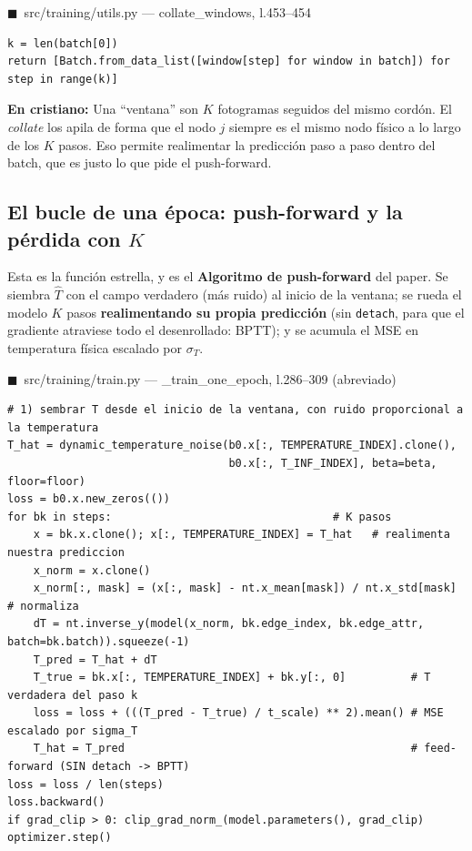 \documentclass[11pt]{article}
\theoremstyle{definition}
\theoremstyle{plain}
\newcommand{\dummies}[1]{%
  \par\smallskip\noindent
  \colorbox{yellow!18}{\parbox{\dimexpr\linewidth-2\fboxsep}{%
  \small\textbf{En cristiano:} #1}}\par\smallskip}
\newcommand{\srcref}[1]{\par\smallskip\noindent
  {\footnotesize\ttfamily\textcolor{srcblue}{$\blacksquare$\ #1}}\par\vspace{1pt}}
\begin{document}
\srcref{src/training/utils.py — collate\_windows, l.453--454}
\begin{lstlisting}
k = len(batch[0])
return [Batch.from_data_list([window[step] for window in batch]) for step in range(k)]
\end{lstlisting}

\dummies{Una ``ventana'' son $K$ fotogramas seguidos del mismo cordón. El
\emph{collate} los apila de forma que el nodo $j$ siempre es el mismo nodo físico a
lo largo de los $K$ pasos. Eso permite realimentar la predicción paso a paso dentro
del batch, que es justo lo que pide el push-forward.}

\subsection{El bucle de una época: push-forward y la pérdida con $K$}

Esta es la función estrella, y es el \textbf{Algoritmo de push-forward} del paper.
Se siembra $\hat T$ con el campo verdadero (más ruido) al inicio de la ventana; se
rueda el modelo $K$ pasos \textbf{realimentando su propia predicción} (sin
\texttt{detach}, para que el gradiente atraviese todo el desenrollado: BPTT); y se
acumula el MSE en temperatura física escalado por $\sigma_T$.

\srcref{src/training/train.py — \_train\_one\_epoch, l.286--309 (abreviado)}
\begin{lstlisting}
# 1) sembrar T desde el inicio de la ventana, con ruido proporcional a la temperatura
T_hat = dynamic_temperature_noise(b0.x[:, TEMPERATURE_INDEX].clone(),
                                  b0.x[:, T_INF_INDEX], beta=beta, floor=floor)
loss = b0.x.new_zeros(())
for bk in steps:                                  # K pasos
    x = bk.x.clone(); x[:, TEMPERATURE_INDEX] = T_hat   # realimenta nuestra prediccion
    x_norm = x.clone()
    x_norm[:, mask] = (x[:, mask] - nt.x_mean[mask]) / nt.x_std[mask]   # normaliza
    dT = nt.inverse_y(model(x_norm, bk.edge_index, bk.edge_attr, batch=bk.batch)).squeeze(-1)
    T_pred = T_hat + dT
    T_true = bk.x[:, TEMPERATURE_INDEX] + bk.y[:, 0]          # T verdadera del paso k
    loss = loss + (((T_pred - T_true) / t_scale) ** 2).mean() # MSE escalado por sigma_T
    T_hat = T_pred                                            # feed-forward (SIN detach -> BPTT)
loss = loss / len(steps)
loss.backward()
if grad_clip > 0: clip_grad_norm_(model.parameters(), grad_clip)
optimizer.step()
\end{lstlisting}
\end{document}
